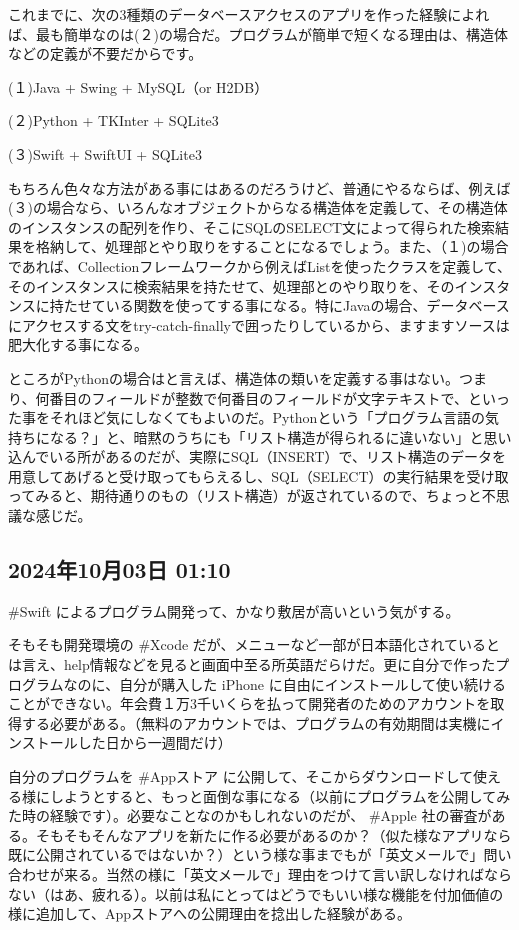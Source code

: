 これまでに、次の3種類のデータベースアクセスのアプリを作った経験によれば、最も簡単なのは(２)の場合だ。プログラムが簡単で短くなる理由は、構造体などの定義が不要だからです。

(１)Java + Swing + MySQL（or H2DB）

(２)Python + TKInter + SQLite3

(３)Swift + SwiftUI + SQLite3

もちろん色々な方法がある事にはあるのだろうけど、普通にやるならば、例えば(３)の場合なら、いろんなオブジェクトからなる構造体を定義して、その構造体のインスタンスの配列を作り、そこにSQLのSELECT文によって得られた検索結果を格納して、処理部とやり取りをすることになるでしょう。また、（１)の場合であれば、Collectionフレームワークから例えばListを使ったクラスを定義して、そのインスタンスに検索結果を持たせて、処理部とのやり取りを、そのインスタンスに持たせている関数を使ってする事になる。特にJavaの場合、データベースにアクセスする文をtry-catch-finallyで囲ったりしているから、ますますソースは肥大化する事になる。

ところがPythonの場合はと言えば、構造体の類いを定義する事はない。つまり、何番目のフィールドが整数で何番目のフィールドが文字テキストで、といった事をそれほど気にしなくてもよいのだ。Pythonという「プログラム言語の気持ちになる？」と、暗黙のうちにも「リスト構造が得られるに違いない」と思い込んでいる所があるのだが、実際にSQL（INSERT）で、リスト構造のデータを用意してあげると受け取ってもらえるし、SQL（SELECT）の実行結果を受け取ってみると、期待通りのもの（リスト構造）が返されているので、ちょっと不思議な感じだ。

\subsection*{2024年10月03日 01:10}

\#Swift によるプログラム開発って、かなり敷居が高いという気がする。

そもそも開発環境の \#Xcode だが、メニューなど一部が日本語化されているとは言え、help情報などを見ると画面中至る所英語だらけだ。更に自分で作ったプログラムなのに、自分が購入した iPhone に自由にインストールして使い続けることができない。年会費１万3千いくらを払って開発者のためのアカウントを取得する必要がある。（無料のアカウントでは、プログラムの有効期間は実機にインストールした日から一週間だけ）

自分のプログラムを \#Appストア に公開して、そこからダウンロードして使える様にしようとすると、もっと面倒な事になる（以前にプログラムを公開してみた時の経験です）。必要なことなのかもしれないのだが、 \#Apple 社の審査がある。そもそもそんなアプリを新たに作る必要があるのか？（似た様なアプリなら既に公開されているではないか？）という様な事までもが「英文メールで」問い合わせが来る。当然の様に「英文メールで」理由をつけて言い訳しなければならない（はあ、疲れる）。以前は私にとってはどうでもいい様な機能を付加価値の様に追加して、Appストアへの公開理由を捻出した経験がある。

